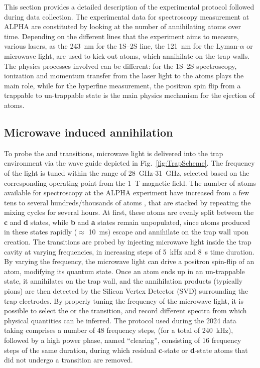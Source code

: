 This section provides a detailed description of the experimental protocol followed during data collection. The experimental data for spectroscopy measurement at ALPHA are constituted by looking at the number of annihilating atoms over time. Depending on the different lines that the experiment aims to measure, various lasers, as the \SI{243}{\nano\meter} for the 1S--2S line, the \SI{121}{\nano \meter} for the Lyman-$\alpha$ or microwave light, are used to kick-out atoms, which annihilate on the trap walls. The physics processes involved can be different: for the 1S--2S spectroscopy, ionization and momentum transfer from the laser light to the atoms plays the main role, while for the hyperfine measurement, the positron spin flip from a trappable to un-trappable state is the main physics mechanism for the ejection of atoms.

\subsection{Microwave induced annihilation}

To probe the \cb and \da transitions, microwave light is delivered into the trap environment via the wave guide depicted in Fig.~\ref{fig:TrapScheme}. The frequency of the light is tuned within the range of \SI{28}{\giga \hertz}-\SI{31}{\giga \hertz}, selected based on the corresponding operating point from the \SI{1}{\tesla} magnetic field. The number of atoms available for spectroscopy at the ALPHA experiment have increased from a few tens to several hundreds/thousands of atoms \cite{Akbari:2025mli}, that are stacked by repeating the mixing cycles for several hours. At first, these atoms are evenly split between the \textbf{c} and \textbf{d} states, while \textbf{b} and \textbf{a} states remain unpopulated, since atoms produced in these states rapidly ($\approx$ \SI{10}{\milli \second}) escape and annihilate on the trap wall upon creation.
The transitions are probed by injecting microwave light inside the trap cavity at varying frequencies, in increasing steps of \SI{5}{\kilo \hertz} and \SI{8}{\second} time duration. By varying the frequency, the microwave light can drive a positron spin-flip of an atom, modifying its quantum state. Once an atom ends up in an un-trappable state, it annihilates on the trap wall, and the annihilation products (typically pions) are then detected by the Silicon Vertex Detector (SVD) surrounding the trap electrodes. By properly tuning the frequency of the microwave light, it is possible to select the \cb or the \da transition, and record different spectra from which physical quantities can be inferred.
The protocol used during the 2024 data taking comprises a number of 48 frequency steps, (for a total of \SI{240}{\kilo \hertz}), followed by a high power phase, named ``clearing'', consisting of 16 frequency steps of the same duration, during which residual \textbf{c}-state or \textbf{d}-state atoms that did not undergo a transition are removed. 

